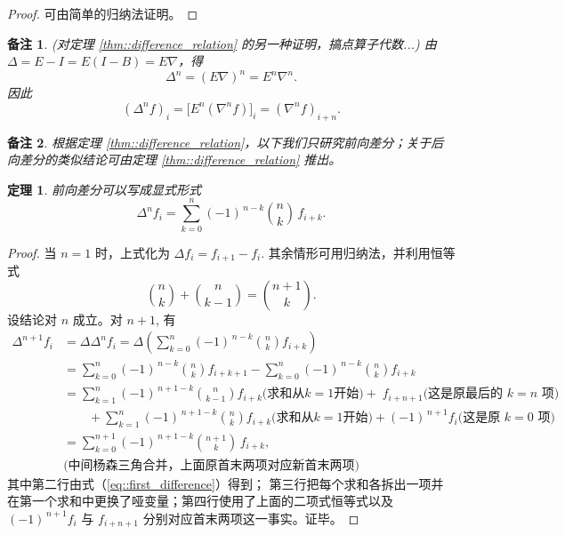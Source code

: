 \documentclass[a4paper]{ctexart}
\newtheorem{theorem}{定理}
\newtheorem{remark}{备注}
\numberwithin{theorem}{section}
\numberwithin{equation}{section}
\numberwithin{figure}{section}
\numberwithin{remark}{section}
\begin{document}
\begin{proof}
可由简单的归纳法证明。
\end{proof}

\begin{remark}
    (对定理 \ref{thm::difference_relation} 的另一种证明，搞点算子代数...)
由 $\Delta=E-I=E(I-B)=E\nabla$，得
\begin{equation*}
\Delta^{n}=(E\nabla)^{n}=E^{n}\nabla^{n}.
\end{equation*}
因此
\begin{equation*}
(\Delta^{n}f)_i=\bigl[E^{n}(\nabla^{n}f)\bigr]_i=(\nabla^{n}f)_{i+n}.
\end{equation*}
\end{remark}

\begin{remark}
根据定理 \ref{thm::difference_relation}，以下我们只研究前向差分；关于后向差分的类似结论可由定理 \ref{thm::difference_relation} 推出。
\end{remark}

\begin{theorem}
    \label{thm::difference_explicit}
前向差分可以写成显式形式
\begin{equation}
\Delta^{n} f_i=\sum_{k=0}^{n}(-1)^{\,n-k}\binom{n}{k}\,f_{i+k}.
\end{equation}
\end{theorem}

\begin{proof}
当 $n=1$ 时，上式化为 $\Delta f_i=f_{i+1}-f_i$. 其余情形可用归纳法，并利用恒等式
\begin{equation}
\binom{n}{k}+\binom{n}{k-1}=\binom{n+1}{k}.
\end{equation}
设结论对 $n$ 成立。对 $n+1$, 有
\begin{align*}
\Delta^{n+1}f_i
&=\Delta\Delta^{n}f_i
=\Delta\!\left(\sum_{k=0}^{n}(-1)^{\,n-k}\binom{n}{k}f_{i+k}\right)\\
&=\sum_{k=0}^{n}(-1)^{\,n-k}\binom{n}{k}f_{i+k+1}
-\sum_{k=0}^{n}(-1)^{\,n-k}\binom{n}{k}f_{i+k}\\
&=\sum_{k=1}^{n}(-1)^{\,n+1-k}\binom{n}{k-1}f_{i+k} \mbox{(求和从$k = 1$开始)}
+\;f_{i+n+1} \mbox{(这是原最后的 $k = n$ 项)}\\
&\qquad+\sum_{k=1}^{n}(-1)^{\,n+1-k}\binom{n}{k}f_{i+k} \mbox{(求和从$k = 1$开始)}
+(-1)^{\,n+1}f_i \mbox{(这是原 $k = 0$ 项)}\\
&=\sum_{k=0}^{n+1}(-1)^{\,n+1-k}\binom{n+1}{k}\,f_{i+k}, \\
& \mbox{(中间杨森三角合并，上面原首末两项对应新首末两项)}
\end{align*}
其中第二行由式（\ref{eq::first_difference}）得到；
第三行把每个求和各拆出一项并在第一个求和中更换了哑变量；第四行使用了上面的二项式恒等式以及 $(-1)^{\,n+1}f_i$ 与 $f_{i+n+1}$ 
分别对应首末两项这一事实。证毕。
\end{proof}
\end{document}
